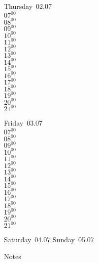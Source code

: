 \documentclass[11pt,a4paper]{book}\usepackage[]{graphicx}\usepackage[]{color}
\begin{document}
\clearpage
\begin{headerbox}
\end{headerbox}
\begin{weekdaybox}
  Thursday~02.07\\
  { 
  \vfill
  $07^{00}$\\
$08^{00}$\\
$09^{00}$\\
$10^{00}$\\
$11^{00}$\\
$12^{00}$\\
$13^{00}$\\
$14^{00}$\\
$15^{00}$\\
$16^{00}$\\
$17^{00}$\\
$18^{00}$\\
$19^{00}$\\
$20^{00}$\\
$21^{00}$\\
  }
\end{weekdaybox} 
\begin{weekdaybox}
  Friday~03.07\\
  { 
  \vfill
  $07^{00}$\\
$08^{00}$\\
$09^{00}$\\
$10^{00}$\\
$11^{00}$\\
$12^{00}$\\
$13^{00}$\\
$14^{00}$\\
$15^{00}$\\
$16^{00}$\\
$17^{00}$\\
$18^{00}$\\
$19^{00}$\\
$20^{00}$\\
$21^{00}$\\
  }
\end{weekdaybox}
\begin{weekendbox}
  Saturday~04.07
  \tcblower
  Sunday~05.07
\end{weekendbox} %
\begin{notebox}
  Notes
\end{notebox}
\clearpage
\end{document}
